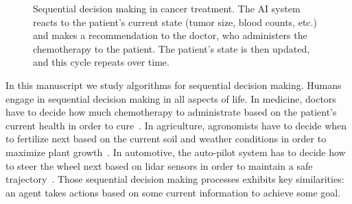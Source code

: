 \begin{figure}[htbp]
    \caption{Sequential decision making in cancer treatment. The AI system reacts to the patient's current state (tumor size, blood counts, etc.) and makes a recommendation to the doctor, who administers the chemotherapy to the patient. The patient's state is then updated, and this cycle repeats over time.}
    \label{fig:cancer-treatment-sdm}
\end{figure}
In this manuscript we study algorithms for sequential decision making. Humans engage in sequential decision making in all aspects of life. In medicine, doctors have to decide how much chemotherapy to administrate based on the patient's current health in order to cure~\cite{cancer}. In agriculture, agronomists have to decide when to fertilize next based on the current soil and weather conditions in order to maximize plant growth~\cite{agriculture}. 
In automotive, the auto-pilot system has to decide how to steer the wheel next based on lidar sensors in order to maintain a safe trajectory~\cite{driving}. 
Those sequential decision making processes exhibits key similarities: an agent takes actions based on some current information to achieve some goal.

